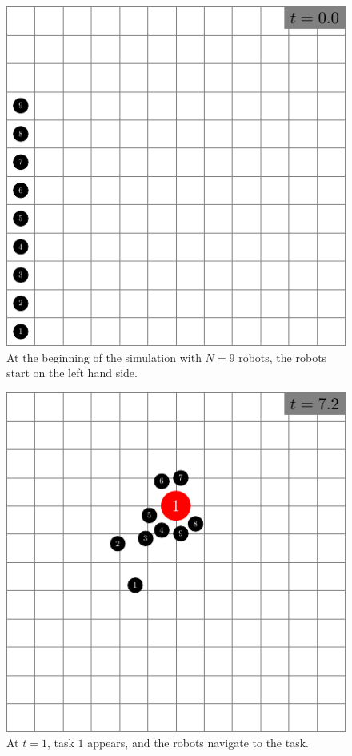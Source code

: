 \documentclass[conference,letterpaper]{IEEEtran}
\begin{document}
\begin{figure}[ht]
    \includegraphics[width=\linewidth]{sim1.pdf}

    \caption{At the beginning of the simulation with $N = 9$ robots, the robots
    start on the left hand side.}
    \label{fig:simstart}

\end{figure}

\begin{figure}[ht]
    \includegraphics[width=\linewidth]{sim73.pdf}

    \caption{At $t = 1$, task $1$ appears, and the robots navigate to the
    task.}
    \label{fig:sim73}

\end{figure}
\end{document}
